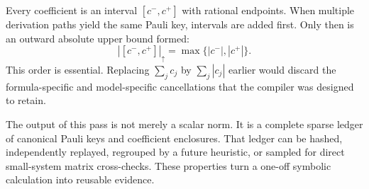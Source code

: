 Every coefficient is an interval $[c^-,c^+]$ with rational endpoints.  When
multiple derivation paths yield the same Pauli key, intervals are added first.
Only then is an outward absolute upper bound formed:
\begin{equation}
  |[c^-,c^+]|_\uparrow=\max\{|c^-|,|c^+|\}.
\end{equation}
This order is essential.  Replacing $\sum_jc_j$ by $\sum_j|c_j|$ earlier would
discard the formula-specific and model-specific cancellations that the
compiler was designed to retain.

The output of this pass is not merely a scalar norm.  It is a complete sparse
ledger of canonical Pauli keys and coefficient enclosures.  That ledger can be
hashed, independently replayed, regrouped by a future heuristic, or sampled
for direct small-system matrix cross-checks.  These properties turn a
one-off symbolic calculation into reusable evidence.
